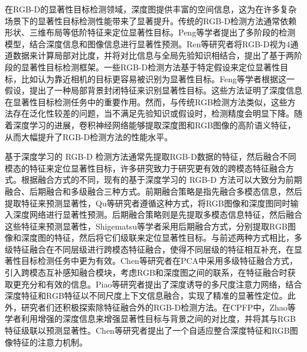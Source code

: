 

在RGB-D的显著性目标检测领域，深度图提供丰富的空间信息，这为在许多复杂场景下的显著性目标检测性能带来了显著提升。传统的RGB-D检测方法通常依赖形状、三维布局等低阶特征来定位显著性目标。Peng等学者提出了多阶段的检测模型，结合深度信息和图像信息进行显著性预测。Ren等研究者将RGB-D视为4通道数据来计算局部对比度，并将对比信息与全局先验知识相结合，提出了基于两阶段的显著性目标检测框架。一些RGB-D检测方法基于特定假设来定位显著性目标，比如认为靠近相机的目标更容易被识别为显著性目标。Feng等学者根据这一假设，提出了一种局部背景封闭特征来识别显著性目标。这些方法证明了深度信息在显著性目标检测任务中的重要作用。然而，与传统RGB检测方法类似，这些方法存在泛化性较差的问题，当不满足先验知识或假设时，检测精度会明显下降。随着深度学习的进展，卷积神经网络能够提取深度图和RGB图像的高阶语义特征，从而大幅提升了RGB-D检测方法的性能水平。


基于深度学习的 RGB-D 检测方法通常先提取RGB-D数据的特征，然后融合不同模态的特征来定位显著性目标，许多研究致力于研究更有效的跨模态特征融合方式。根据融合方式的不同，现有的基于深度学习的 RGB-D 方法可以大致分为前期融合、后期融合和多级融合三种方式。前期融合策略是指先融合多模态信息，然后提取特征来预测显著性，Qu等研究者遵循这种方式，将RGB图像和深度图同时输入深度网络进行显著性预测。后期融合策略则是先提取多模态信息特征，然后融合这些特征来预测显著性，Shigematsu等学者采用后期融合方式，分别提取RGB图像和深度图的特征，然后将它们级联来定位显著性目标。与前述两种方式相比，多级特征融合在不同层级进行跨模态特征融合，使得不同层级的特征相互补充，在显著性目标检测任务中更为有效。Chen等研究者在PCA中采用多级特征融合方式，引入跨模态互补感知融合模块，考虑RGB和深度图之间的联系，在特征融合时获取更充分和有效的信息。Piao等研究者提出了深度诱导的多尺度注意力网络，结合深度特征和RGB特征以不同尺度上下文信息融合，实现了精准的显著性定位。此外，研究者们还积极探索除特征融合外的RGB-D检测方法。在CPFP中，Zhao等学者利用增强的深度信息来增强显著性目标与背景之间的对比度，并将其与RGB特征级联以预测显著性。Chen等研究者提出了一个自适应整合深度特征和RGB图像特征的注意力机制。




